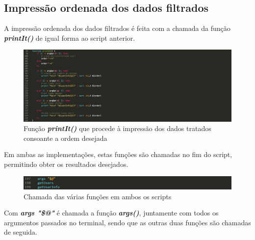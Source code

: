 \documentclass[10pt,portuguese]{article}
\begin{document}
\subsection{Impressão ordenada dos dados filtrados}
\par A impressão ordenada dos dados filtrados é feita com a chamada da função \textbf{\textit{printIt()}} de igual forma ao script anterior.
\begin{figure}[!h]
    \centering
    \includegraphics[width=\textwidth]{comparestats/printit_c.png}
    \caption{Função \textbf{\textit{printIt()}} que procede à impressão dos dados tratados consoante a ordem desejada}
\end{figure}

\clearpage
Em ambas as implementações, estas funções são chamadas no fim do script, permitindo obter os resultados desejados.
\begin{figure}[!h]
    \centering
    \includegraphics[width=\textwidth]{function_call.png}
    \caption{Chamada das várias funções em ambos os scripts}
\end{figure}
\newline
\par Com \textbf{\textit{args "\$@"}} é chamada a função \textbf{\textit{args()}}, juntamente com todos os argumentos passados no terminal, sendo que as outras duas funções são chamadas de seguida.
\clearpage
\end{document}
